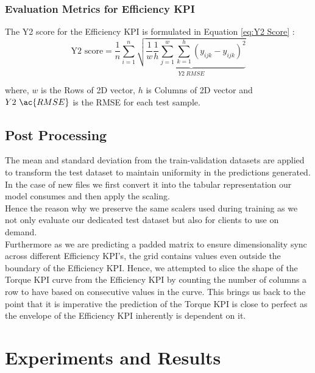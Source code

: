 \documentclass{report} %
\begin{document}
\subsection{Evaluation Metrics for Efficiency \ac{KPI}}\label{sec:Evaluation Metrics for 3D KPI}

The Y2 score for the Efficiency \ac{KPI} is formulated in Equation \ref{eq:Y2 Score} :
\begin{equation}
    \text{Y2 score} = \frac{1}{n} \sum_{i=1}^{n} \underbrace{ \sqrt{\frac{1}{w} \frac{1}{h} \sum_{j=1}^{w} \sum_{k=1}^{h} (y_{ijk} - \hat{y}_{ijk})^2}}_{Y2\ RMSE}
    \label{eq:Y2 Score}
\end{equation}
    
where, \(w\) is the Rows of 2\ac{D} vector, \(h\) is Columns of 2\ac{D} vector and \(Y2\ \ac{RMSE}\) is the \ac{RMSE} for each test sample.

\section{Post Processing}\label{sec:Post Processing}

The mean and standard deviation from the train-validation datasets are applied to transform the test dataset to maintain uniformity in the predictions generated.
In the case of new files we first convert it into the tabular representation our model consumes and then apply the scaling.\\
Hence the reason why we preserve the same scalers used during training as we not only evaluate our dedicated test dataset but also for clients to use on demand. \\

Furthermore as we are predicting a padded matrix to ensure dimensionality sync across different Efficiency \ac{KPI}'s, the grid contains values even outside the boundary of the Efficiency \ac{KPI}.
Hence, we attempted to slice the shape of the Torque \ac{KPI} curve from the Efficiency \ac{KPI} by counting the number of columns a row to have based on consecutive values in the curve.
This brings us back to the point that it is imperative the prediction of the Torque \ac{KPI} is close to perfect as the envelope of the Efficiency \ac{KPI} inherently is dependent on it.

\newpage 
\newpage 

\chapter{Experiments and Results}
\end{document}
